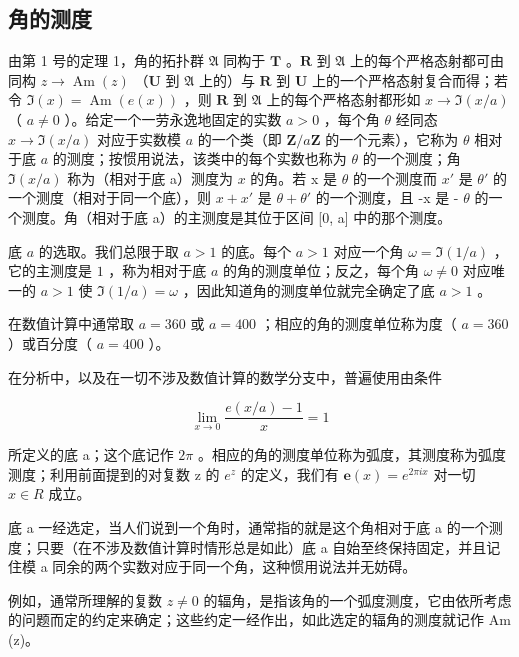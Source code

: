 \subsection{角的测度}

由第 1 号的定理 1，角的拓扑群 \(\mathfrak{A}\) 同构于 \(\mathbf{T}\) 。\(\mathbf{R}\) 到 \(\mathfrak{A}\) 上的每个严格态射都可由同构 \(z \to \operatorname{Am}(z)\) （\(\mathbf{U}\) 到 \(\mathfrak{A}\) 上的）与 \(\mathbf{R}\) 到 \(\mathbf{U}\) 上的一个严格态射复合而得；若令 \(\Im(x) = \operatorname{Am}(e(x))\) ，则 \(\mathbf{R}\) 到 \(\mathfrak{A}\) 上的每个严格态射都形如 \(x \to \Im(x/a)\) （ \(a \neq 0\) ）。给定一个一劳永逸地固定的实数 \(a > 0\) ，每个角 \(\theta\) 经同态 \(x \to \Im(x/a)\) 对应于实数模 \(a\) 的一个类（即 \(\mathbf{Z}/a\mathbf{Z}\) 的一个元素），它称为 \(\theta\) 相对于底 \(a\) 的测度；按惯用说法，该类中的每个实数也称为 \(\theta\) 的一个测度；角 \(\Im(x/a)\) 称为（相对于底 a）测度为 \(x\) 的角。若 x 是 \(\theta\) 的一个测度而 \(x'\) 是 \(\theta'\) 的一个测度（相对于同一个底），则 \(x + x'\) 是 \(\theta + \theta'\) 的一个测度，且 -x 是 - \(\theta\) 的一个测度。角（相对于底 a）的主测度是其位于区间 {[}0, a{]} 中的那个测度。

底 \(a\) 的选取。我们总限于取 \(a > 1\) 的底。每个 \(a > 1\) 对应一个角 \(\omega = \Im(1/a)\) ，它的主测度是 \(1\) ，称为相对于底 \(a\) 的角的测度单位；反之，每个角 \(\omega \neq 0\) 对应唯一的 \(a > 1\) 使 \(\Im(1/a) = \omega\) ，因此知道角的测度单位就完全确定了底 \(a > 1\) 。

在数值计算中通常取 \(a = 360\) 或 \(a = 400\) ；相应的角的测度单位称为度（ \(a = 360\) ）或百分度（ \(a = 400\) ）。

在分析中，以及在一切不涉及数值计算的数学分支中，普遍使用由条件

\[
\lim _ {x \rightarrow 0} \frac {e (x / a) - 1}{x} = 1
\]

所定义的底 a；这个底记作 \(2\pi\) 。相应的角的测度单位称为弧度，其测度称为弧度测度；利用前面提到的对复数 z 的 \(e^{z}\) 的定义，我们有 \(\boldsymbol{e}(x)=e^{2\pi ix}\) 对一切 \(x\in R\) 成立。

底 a 一经选定，当人们说到一个角时，通常指的就是这个角相对于底 a 的一个测度；只要（在不涉及数值计算时情形总是如此）底 a 自始至终保持固定，并且记住模 a 同余的两个实数对应于同一个角，这种惯用说法并无妨碍。

例如，通常所理解的复数 \(z \neq 0\) 的辐角，是指该角的一个弧度测度，它由依所考虑的问题而定的约定来确定；这些约定一经作出，如此选定的辐角的测度就记作 Am (z)。

